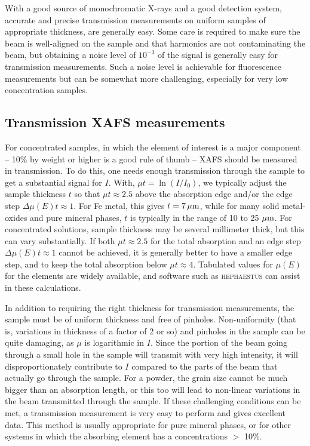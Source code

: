 With a good source of monochromatic X-rays and a good detection system,
accurate and precise transmission measurements on uniform samples of
appropriate thickness, are generally easy.  Some care is required to make
sure the beam is well-aligned on the sample and that harmonics are not
contaminating the beam, but obtaining a noise level of $10^{-3}$ of the
signal is generally easy for transmission measurements.  Such a noise level
is achievable for fluorescence measurements but can be somewhat more
challenging, especially for very low concentration samples.

\subsection{Transmission XAFS measurements}

For concentrated samples, in which the element of interest is a major
component -- 10\% by weight or higher is a good rule of thumb -- XAFS
should be measured in transmission.  To do this, one needs enough
transmission through the sample to get a substantial signal for $I$.  With,
${\mu}t=\ln(I/I_0)$, we typically adjust the sample thickness $t$ so that
${\mu}t \approx 2.5$ above the absorption edge and/or the edge step $\Delta
\mu(E)t \approx 1$.  For Fe metal, this gives $t=7\, \rm {\mu}m$, while for
many solid metal-oxides and pure mineral phases, $t$ is typically in the
range of 10 to 25 $\rm {\mu}m$.  For concentrated solutions, sample
thickness may be several millimeter thick, but this can vary substantially.
If both $\mu t \approx 2.5$ for the total absorption and an edge step
$\Delta \mu(E)t \approx 1$ cannot be achieved, it is generally better to
have a smaller edge step, and to keep the total absorption below $\mu t
\approx 4$.  Tabulated values for $\mu(E)$ for the elements are widely
available, and software such as {\scshape{hephaestus}}\cite{horae} can
assist in these calculations.

In addition to requiring the right thickness for transmission measurements,
the sample must be of uniform thickness and free of pinholes.
Non-uniformity (that is, variations in thickness of a factor of 2 or so)
and pinholes in the sample can be quite damaging, as $\mu$ is logarithmic
in $I$.  Since the portion of the beam going through a small hole in the
sample will transmit with very high intensity, it will disproportionately
contribute to $I$ compared to the parts of the beam that actually go
through the sample.  For a powder, the grain size cannot be much bigger
than an absorption length, or this too will lead to non-linear variations
in the beam transmitted through the sample.  If these challenging
conditions can be met, a transmission measurement is very easy to perform
and gives excellent data.  This method is usually appropriate for pure
mineral phases, or for other systems in which the absorbing element has a
concentrations $>$ 10\%.

